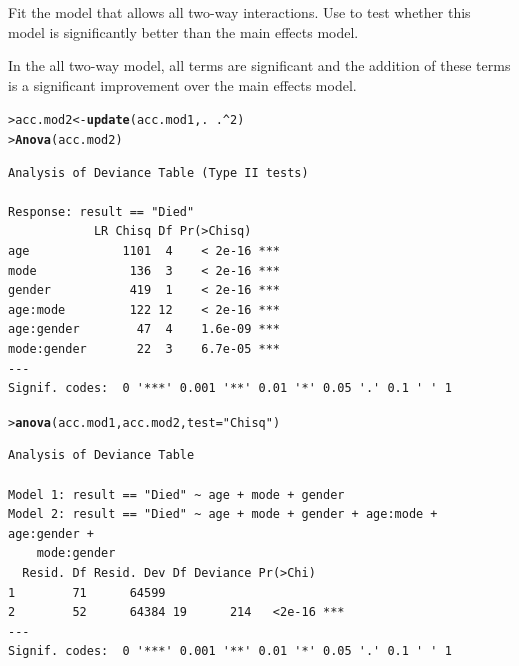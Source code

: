 \documentclass[10pt]{report}\usepackage[]{graphicx}\usepackage[]{color}
\makeatletter
\newcommand{\hlnum}[1]{\textcolor[rgb]{0.686,0.059,0.569}{#1}}%
\newcommand{\hlstr}[1]{\textcolor[rgb]{0.192,0.494,0.8}{#1}}%
\newcommand{\hlopt}[1]{\textcolor[rgb]{0,0,0}{#1}}%
\newcommand{\hlstd}[1]{\textcolor[rgb]{0.345,0.345,0.345}{#1}}%
\newcommand{\hlkwb}[1]{\textcolor[rgb]{0.69,0.353,0.396}{#1}}%
\newcommand{\hlkwc}[1]{\textcolor[rgb]{0.333,0.667,0.333}{#1}}%
\newcommand{\hlkwd}[1]{\textcolor[rgb]{0.737,0.353,0.396}{\textbf{#1}}}%
\newenvironment{kframe}{%
 \def\at@end@of@kframe{}%
 \ifinner\ifhmode%
  \def\at@end@of@kframe{\end{minipage}}%
  \begin{minipage}{\columnwidth}%
 \fi\fi%
 \def\FrameCommand##1{\hskip\@totalleftmargin \hskip-\fboxsep
 \colorbox{shadecolor}{##1}\hskip-\fboxsep
     \hskip-\linewidth \hskip-\@totalleftmargin \hskip\columnwidth}%
 \MakeFramed {\advance\hsize-\width
   \@totalleftmargin\z@ \linewidth\hsize
   \@setminipage}}%
 {\par\unskip\endMakeFramed%
 \at@end@of@kframe}
\newenvironment{knitrout}{}{} %
\renewenvironment{knitrout}{\small\renewcommand{\baselinestretch}{.85}}{} %
\makeatother
\begin{document}
\begin{Exercises}
\begin{enumerate*}
    \item Fit the model that allows all two-way interactions.  Use  to test whether this model is
    significantly better than the main effects model.
    \begin{ans}
    In the all two-way model, all terms are significant and the addition of these terms is a significant
    improvement over the main effects model.
\begin{knitrout}\footnotesize
{}\color{fgcolor}\begin{kframe}
\begin{alltt}
\hlstd{> }\hlstd{acc.mod2} \hlkwb{<-} \hlkwd{update}\hlstd{(acc.mod1, .} \hlopt{~} \hlstd{.}\hlopt{^}\hlnum{2}\hlstd{)}
\hlstd{> }\hlkwd{Anova}\hlstd{(acc.mod2)}
\end{alltt}
\begin{verbatim}
Analysis of Deviance Table (Type II tests)

Response: result == "Died"
            LR Chisq Df Pr(>Chisq)    
age             1101  4    < 2e-16 ***
mode             136  3    < 2e-16 ***
gender           419  1    < 2e-16 ***
age:mode         122 12    < 2e-16 ***
age:gender        47  4    1.6e-09 ***
mode:gender       22  3    6.7e-05 ***
---
Signif. codes:  0 '***' 0.001 '**' 0.01 '*' 0.05 '.' 0.1 ' ' 1
\end{verbatim}
\begin{alltt}
\hlstd{> }\hlkwd{anova}\hlstd{(acc.mod1, acc.mod2,} \hlkwc{test}\hlstd{=}\hlstr{"Chisq"}\hlstd{)}
\end{alltt}
\begin{verbatim}
Analysis of Deviance Table

Model 1: result == "Died" ~ age + mode + gender
Model 2: result == "Died" ~ age + mode + gender + age:mode + age:gender + 
    mode:gender
  Resid. Df Resid. Dev Df Deviance Pr(>Chi)    
1        71      64599                         
2        52      64384 19      214   <2e-16 ***
---
Signif. codes:  0 '***' 0.001 '**' 0.01 '*' 0.05 '.' 0.1 ' ' 1
\end{verbatim}
\end{kframe}
\end{knitrout}
    \end{ans}
    

\end{enumerate*}
\end{Exercises}
\end{document}

